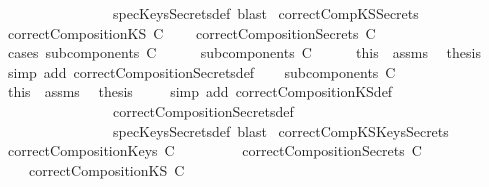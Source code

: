 \begin{isabellebody}
\ \ \ \ \ \ \ \ \ \ \ \ \ \ \ \ specKeysSecrets{\isacharunderscore}def{\isacharcomma}\ blast{\isacharparenright}\isanewline
{}\isamarkupfalse%
%
\endisatagproof
{\isafoldproof}%
%
\isadelimproof
\isanewline
%
\endisadelimproof
\isanewline
{}\isamarkupfalse%
\ correctCompKS{\isacharunderscore}Secrets{\isacharcolon}\isanewline
{}\ {\isachardoublequoteopen}correctCompositionKS\ C{\isachardoublequoteclose}\isanewline
{}\ \ \ \ {\isachardoublequoteopen}correctCompositionSecrets\ C{\isachardoublequoteclose}\isanewline
%
\isadelimproof
%
\endisadelimproof
%
\isatagproof
{}\isamarkupfalse%
\ {\isacharparenleft}cases\ {\isachardoublequoteopen}subcomponents\ C\ {\isacharequal}\ {\isacharbraceleft}{\isacharbraceright}{\isachardoublequoteclose}{\isacharparenright}\isanewline
\ \ \isamarkupfalse%
\ {\isachardoublequoteopen}subcomponents\ C\ {\isacharequal}\ {\isacharbraceleft}{\isacharbraceright}{\isachardoublequoteclose}\isanewline
\ \ \isamarkupfalse%
\ this\ \ assms\ \isamarkupfalse%
\ {\isacharquery}thesis\isanewline
\ \ \isamarkupfalse%
\ {\isacharparenleft}simp\ add{\isacharcolon}\ correctCompositionSecrets{\isacharunderscore}def{\isacharparenright}\isanewline
{}\isamarkupfalse%
\isanewline
\ \ \isamarkupfalse%
\ {\isachardoublequoteopen}subcomponents\ C\ {\isasymnoteq}\ {\isacharbraceleft}{\isacharbraceright}{\isachardoublequoteclose}\isanewline
\ \ \isamarkupfalse%
\ this\ \ assms\ \isamarkupfalse%
\ {\isacharquery}thesis\ \isanewline
\ \ \isamarkupfalse%
\ {\isacharparenleft}simp\ add{\isacharcolon}\ correctCompositionKS{\isacharunderscore}def\ \isanewline
\ \ \ \ \ \ \ \ \ \ \ \ \ \ \ \ correctCompositionSecrets{\isacharunderscore}def\isanewline
\ \ \ \ \ \ \ \ \ \ \ \ \ \ \ \ specKeysSecrets{\isacharunderscore}def{\isacharcomma}\ blast{\isacharparenright}\isanewline
{}\isamarkupfalse%
%
\endisatagproof
{\isafoldproof}%
%
\isadelimproof
\isanewline
%
\endisadelimproof
\isanewline
{}\isamarkupfalse%
\ correctCompKS{\isacharunderscore}KeysSecrets{\isacharcolon}\isanewline
{}\ {\isachardoublequoteopen}correctCompositionKeys\ C{\isachardoublequoteclose}\isanewline
\ \ \ \ \ \ \ \ \ {\isachardoublequoteopen}correctCompositionSecrets\ C{\isachardoublequoteclose}\isanewline
{}\ \ \ \ {\isachardoublequoteopen}correctCompositionKS\ C{\isachardoublequoteclose}\isanewline

\end{isabellebody}
